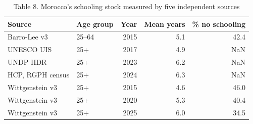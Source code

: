 \begin{table}
\caption{Table 8. Morocco's schooling stock measured by five independent sources}
\label{tab:T8_source_contrast}
\begin{tabular}{llrrr}
\toprule
Source & Age group & Year & Mean years & \% no schooling \\
\midrule
Barro-Lee v3 & 25–64 & 2015 & 5.1 & 42.4 \\
UNESCO UIS & 25+ & 2017 & 4.9 & NaN \\
UNDP HDR & 25+ & 2023 & 6.2 & NaN \\
HCP, RGPH census & 25+ & 2024 & 6.3 & NaN \\
Wittgenstein v3 & 25+ & 2015 & 4.6 & 46.0 \\
Wittgenstein v3 & 25+ & 2020 & 5.3 & 40.4 \\
Wittgenstein v3 & 25+ & 2025 & 6.0 & 34.5 \\
\bottomrule
\end{tabular}
\end{table}
